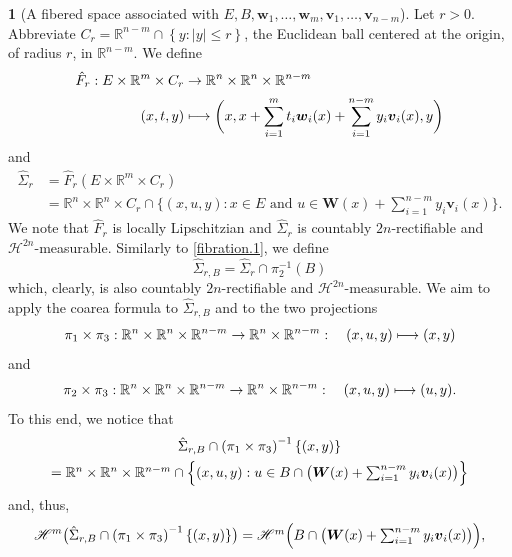 \documentclass[11pt]{article}
\newcounter{cdrthm}[section]
\theoremstyle{definition}
\theoremstyle{jepanonymous}
\newtheorem{jepempty}[cdrthm]{}
\newenvironment{enonce}[2][remark]{\begin{jepempty}[#2]}{\end{jepempty}}
\theoremstyle{plain}
\newcommand\mto{\mathchoice{\longmapsto}{\mapsto}{\mapsto}{\mapsto}}
\newenvironment{Empty}[2][\null]{%
\begin{enonce}[remark]{#1}#2}
{\end{enonce}}
\newcommand{\R}{\mathbb{R}}
\newcommand{\Rm}{\R^m}
\newcommand{\Rn}{\R^n}
\newcommand{\calH}{\mathscr{H}}
\newcommand{\bW}{{\boldsymbol{W}}}
\newcommand{\bv}{{\boldsymbol{v}}}
\newcommand{\bw}{{\boldsymbol{w}}}
\begin{document}
\begin{Empty}[A fibered space associated with $E, B, \bw_1,\ldots,\bw_m,\bv_1,\ldots,\bv_{n-m}$]
\label{fibration.2}
Let $r > 0$.
Abbreviate $C_r = \R^{n-m} \cap \left\{ y: |y| \leq r \right\}$, the Euclidean ball centered at the origin, of radius $r$, in $\R^{n-m}$.
We define
\begin{align*}
\hat{F}_r: E \times \Rm \times C_r &\to \Rn \times \Rn \times \R^{n-m}\\
(x,t,y) &\mto \biggl(x, x + \sum_{i=1}^m t_i \bw_i(x) + \sum_{i=1}^{n-m} y_i \bv_i(x), y \biggr)
\end{align*}
and
\begin{align*}
\hat{\Sigma}_r &= \hat{F}_r \left(E \times \Rm \times C_r \right)\\
&= \Rn \times \Rn \times C_r \cap \textstyle\bigl\{ (x,u,y): x \in E \text{ and } u \in \bW(x) + \sum_{i=1}^{n-m} y_i\bv_i(x)\bigr\}.
\end{align*}
We note that $\hat{F}_r$ is locally Lipschitzian and $\hat{\Sigma}_r$ is countably $2n$-rectifiable and $\calH^{2n}$\nobreakdash-measurable.
Similarly to \ref{fibration.1}, we define
\begin{equation*}
\hat{\Sigma}_{r,B} = \hat{\Sigma}_r \cap \pi_2^{-1}(B)
\end{equation*}
which, clearly, is also countably $2n$-rectifiable and $\calH^{2n}$-measurable.
We aim to apply the coarea formula to $\hat{\Sigma}_{r,B}$ and to the two projections
\begin{equation*}
\pi_1 \times \pi_3: \Rn \times \Rn \times \R^{n-m} \to \Rn \times \R^{n-m}:\quad (x,u,y) \mto (x,y)
\end{equation*}
and
\begin{equation*}
\pi_2 \times \pi_3: \Rn \times \Rn \times \R^{n-m} \to \Rn \times \R^{n-m}:\quad (x,u,y) \mto (u,y).
\end{equation*}
To this end, we notice that
\begin{multline*}
\hat{\Sigma}_{r,B} \cap \left(\pi_1 \times \pi_3 \right)^{-1} \{ (x,y) \} \\ = \textstyle\Rn \times \Rn \times \R^{n-m} \cap \Bigl\{ (x,u,y): u \in B \cap \bigl(\bW(x) + \sum_{i=1}^{n-m} y_i \bv_i(x) \bigr)\Bigr\}
\end{multline*}
and, thus,
\begin{equation*}
\calH^m \bigl(\hat{\Sigma}_{r,B} \cap \left(\pi_1 \times \pi_3 \right)^{-1} \{ (x,y) \}\bigr) = \textstyle\calH^m \Bigl(B \cap \bigl(\bW(x) + \sum_{i=1}^{n-m} y_i \bv_i(x) \bigr) \Bigr),
\end{equation*}

\end{Empty}
\end{document}
